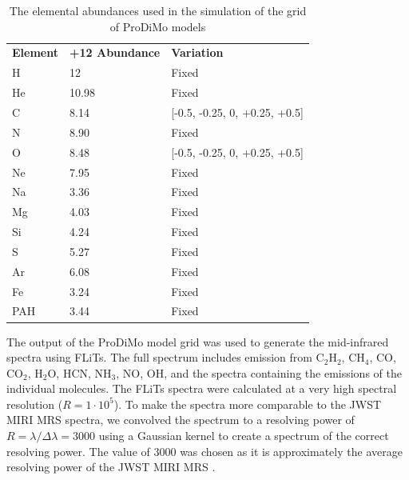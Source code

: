 \documentclass[twoside, single, authoryear, semicolon]{lion-msc}
\newcommand{\4}{$_4$}
\newcommand{\3}{$_3$}
\newcommand{\2}{$_2$}
\begin{document}
\begin{table}[!ht]
\centering
\begin{tabular}{@{}lll@{}}
                                  &                             &                            \\ \hline\midrule
\textbf{Element} & \textbf{+12 Abundance} & \textbf{Variation}            \\ \midrule
H                & 12                     & Fixed                         \\
He               & 10.98                 & Fixed                         \\
C                & 8.14                  & {[}-0.5, -0.25, 0, +0.25, +0.5{]} \\
N                & 8.90                  & Fixed                         \\
O                & 8.48                  & {[}-0.5, -0.25, 0, +0.25, +0.5{]} \\
Ne               & 7.95                  & Fixed                         \\
Na               & 3.36                  & Fixed                         \\
Mg               & 4.03                  & Fixed                         \\
Si               & 4.24                  & Fixed                         \\
S                & 5.27                  & Fixed                         \\
Ar               & 6.08                  & Fixed                         \\
Fe               & 3.24                  & Fixed                         \\
PAH              & 3.44                  & Fixed                         \\ \bottomrule
\end{tabular}
\caption{The elemental abundances used in the simulation of the grid of ProDiMo models}
\label{tab: abundances}
\end{table}



The output of the ProDiMo model grid was used to generate the mid-infrared spectra using FLiTs. The full spectrum includes emission from C\2H\2, CH\4, CO, CO\2, H\2O, HCN, NH\3, NO, OH, and the spectra containing the emissions of the individual molecules. The FLiTs spectra were calculated at a very high spectral resolution ($R=1\cdot10^5$). To make the spectra more comparable to the JWST MIRI MRS spectra, we convolved the spectrum to a resolving power of $R = \lambda/\Delta\lambda = 3000$ using a Gaussian kernel to create a spectrum of the correct resolving power. The value of 3000 was chosen as it is approximately the average resolving power of the JWST MIRI MRS \citep{Argyriou_2023}. 
\end{document}
